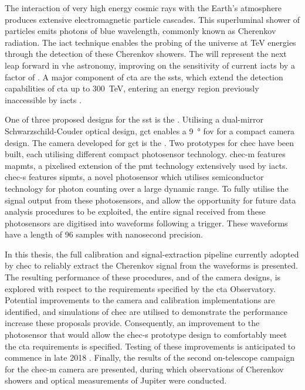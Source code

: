 The interaction of very high energy cosmic rays with the Earth's atmosphere produces extensive electromagnetic particle cascades. This superluminal shower of particles emits photons of blue wavelength, commonly known as Cherenkov radiation. The \gls{iact} technique enables the probing of the universe at \si{TeV} energies through the detection of these Cherenkov showers. The  will represent the next leap forward in \gls{vhe} astronomy, improving on the sensitivity of current \glspl{iact} by a factor of . A major component of \gls{cta} are the \glspl{sst}, which extend the detection capabilities of \gls{cta} up to \SI{300}{TeV}, entering an energy region previously inaccessible by \glspl{iact} . 

One of three proposed designs for the \gls{sst} is the . Utilising a dual-mirror Schwarzschild-Couder optical design, \gls{gct} enables a \SI{9}{\degree} \gls{fov} for a compact camera design. The camera developed for \gls{gct} is the . Two prototypes for \gls{chec} have been built, each utilising different compact photosensor technology. \gls{chec-m} features \glspl{mapmt}, a pixelised extension of the \gls{pmt} technology extensively used by \glspl{iact}. \gls{chec-s} features \glspl{sipmt}, a novel photosensor which utilises semiconductor technology for photon counting over a large dynamic range. To fully utilise the signal output from these photosensors, and allow the opportunity for future data analysis procedures to be exploited, the entire signal received from these photosensors are digitised into waveforms following a trigger. These waveforms have a length of 96 samples with nanosecond precision.

In this thesis, the full calibration and signal-extraction pipeline currently adopted by \gls{chec} to reliably extract the Cherenkov signal from the waveforms is presented. The resulting performance of these procedures, and of the camera designs, is explored with respect to the requirements specified by the \gls{cta} Observatory. Potential improvements to the camera and calibration implementations are identified, and simulations of \gls{chec} are utilised to demonstrate the performance increase these proposals provide. Consequently, an improvement to the photosensor that would allow the \gls{chec-s} prototype design to comfortably meet the \gls{cta} requirements is specified. Testing of these improvements is anticipated to commence in late 2018 . Finally, the results of the second on-telescope campaign for the \gls{chec-m} camera are presented, during which observations of Cherenkov showers and optical measurements of Jupiter were conducted.


